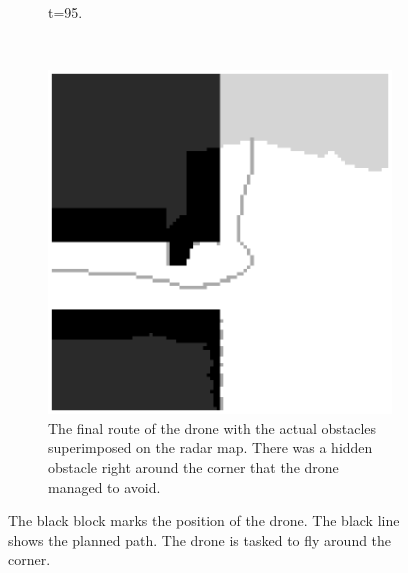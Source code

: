 \begin{figure}
\begin{subfigure}[t]{0.3\textwidth}
\caption{t=95.}
\label{fig:sim_t95}
\end{subfigure}
\,
\begin{subfigure}[t]{0.3\textwidth}
\includegraphics[width=\textwidth]{Figures/Simulation/final_route_superimposed.eps}
\caption{The final route of the drone with the actual obstacles superimposed on the radar map. There was a hidden obstacle right around the corner that the drone managed to avoid.}
\label{fig:sim_final}
\end{subfigure}
\caption{The black block marks the position of the drone. The black line shows the planned path. The drone is tasked to fly around the corner.}
\label{fig:sim_corner}
\end{figure}


